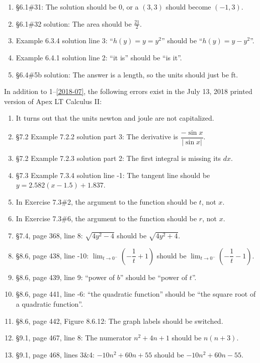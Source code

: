 \documentclass{amsart}
\newcommand{\ds}{\displaystyle}
\newcommand{\abs}[1]{\left\lvert#1\right\rvert}
\begin{document}
\begin{enumerate}
\item \S6.1\#31: The solution should be 0, or a $(3,3)$ should become $(-1,3)$.
\item \S6.1\#32 solution: The area should be $\frac{21}2$.
\item Example 6.3.4 solution line 3: ``$h(y)=y=y^2$'' should be ``$h(y)=y-y^2$''.
\item Example 6.4.1 solution line 2: ``it is'' should be ``is it''.
\item \S6.4\#5b solution: The answer is a length, so the units should just be ft.
\label{2018-07I}
\end{enumerate}\bigskip


In addition to 1--\ref{2018-07}, the following errors exist in the July 13, 2018 printed version of Apex LT Calculus II:
\begin{enumerate}
\item It turns out that the units newton and joule are not capitalized.
\item \S7.2 Example 7.2.2 solution part 3: The derivative is $\dfrac{-\sin x}{\abs{\sin x}}$.
\item \S7.2 Example 7.2.3 solution part 2: The first integral is missing its $dx$.
\item \S7.3 Example 7.3.4 solution line -1: The tangent line should be $y=2.582(x-1.5)+1.837$.
\item In Exercise 7.3\#2, the argument to the function should be $t$, not $x$.
\item In Exercise 7.3\#6, the argument to the function should be $r$, not $x$.
\item \S7.4, page 368, line 8: $\sqrt{4y^2-4}$ should be $\sqrt{4y^2+4}$.
\item \S8.6, page 438, line -10: $\ds\lim_{t\to0^-}\left(-\dfrac1t+1\right)$ should be $\ds\lim_{t\to0^-}\left(-\dfrac1t-1\right)$.
\item \S8.6, page 439, line 9: ``power of $b$'' should be ``power of $t$''.
\item \S8.6, page 441, line -6: ``the quadratic function'' should be ``the square root of a quadratic function''.
\item \S8.6, page 442, Figure 8.6.12: The graph labels should be switched.
\item \S9.1, page 467, line 8: The numerator $n^2+4n+1$ should be $n(n+3)$.
\item \S9.1, page 468, lines 3\&4: $-10n^2+60n+55$ should be $-10n^2+60n-55$.

\end{enumerate}
\end{document}

